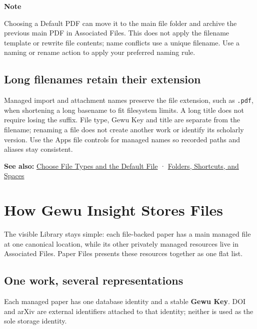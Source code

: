 \documentclass[10pt,letterpaper,oneside]{scrreprt}
\newenvironment{GewuRelated}{\par\nobreak\vspace{3pt}\nobreak\begingroup\small\sffamily\begin{samepage}\noindent}{\par\end{samepage}\endgroup}
\renewenvironment{quote}
  {\Needspace{5\baselineskip}\begin{tcolorbox}[enhanced,breakable,colback=GewuPale,colframe=GewuPale,boxrule=0pt,
    borderline west={1.6pt}{0pt}{GewuBlue},arc=1.2mm,left=2.5mm,right=2.5mm,top=1.7mm,bottom=1.7mm,
    before skip=4pt,after skip=5pt,fontupper=\color{GewuInk}\small]}
  {\end{tcolorbox}}
\begin{document}
\begin{quote}
\textbf{Note}

Choosing a Default PDF can move it to the main file folder and archive the previous main PDF in Associated Files. This does not apply the filename template or rewrite file contents; name conflicts use a unique filename. Use a naming or rename action to apply your preferred naming rule.
\end{quote}

\subsection{Long filenames retain their extension}\label{long-filenames-retain-their-extension}

Managed import and attachment names preserve the file extension, such as \texttt{.pdf}, when shortening a long basename to fit filesystem limits. A long title does not require losing the suffix. File type, Gewu Key and title are separate from the filename; renaming a file does not create another work or identify its scholarly version. Use the App\textquotesingle s file controls for managed names so recorded paths and aliases stay consistent.

\begin{GewuRelated}
\textbf{See also:} \hyperref[versions-current]{Choose File Types and the Default File} · \hyperref[organize]{Folders, Shortcuts, and Spaces}
\end{GewuRelated}

\section{How Gewu Insight Stores Files}\label{storage-model}

The visible Library stays simple: each file-backed paper has a main managed file at one canonical location, while its other privately managed resources live in Associated Files. Paper Files presents these resources together as one flat list.

\subsection{One work, several representations}\label{one-work-several-representations}

Each managed paper has one database identity and a stable \textbf{Gewu Key}. DOI and arXiv are external identifiers attached to that identity; neither is used as the sole storage identity.
\end{document}
